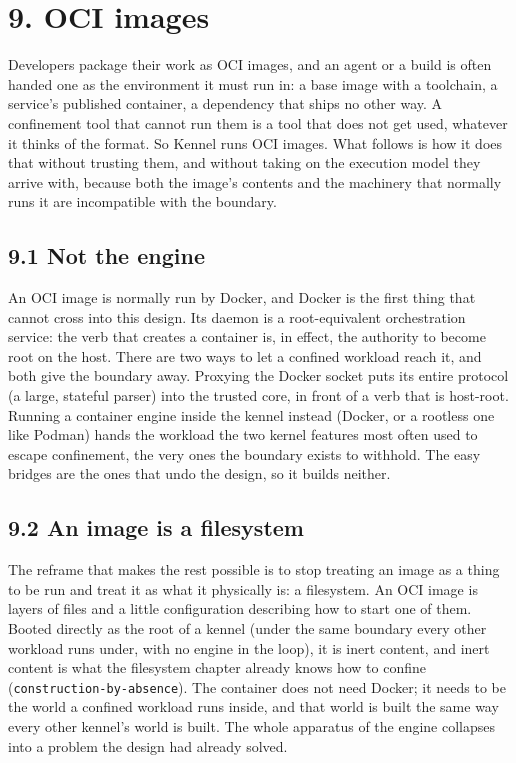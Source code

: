 \hypertarget{oci-images}{%
\chapter{9. OCI images}\label{oci-images}}

Developers package their work as OCI images, and an agent or a build is
often handed one as the environment it must run in: a base image with a
toolchain, a service's published container, a dependency that ships no
other way. A confinement tool that cannot run them is a tool that does
not get used, whatever it thinks of the format. So Kennel runs OCI
images. What follows is how it does that without trusting them, and
without taking on the execution model they arrive with, because both the
image's contents and the machinery that normally runs it are
incompatible with the boundary.

\hypertarget{not-the-engine}{%
\section{9.1 Not the engine}\label{not-the-engine}}

An OCI image is normally run by Docker, and Docker is the first thing
that cannot cross into this design. Its daemon is a root-equivalent
orchestration service: the verb that creates a container is, in effect,
the authority to become root on the host. There are two ways to let a
confined workload reach it, and both give the boundary away. Proxying
the Docker socket puts its entire protocol (a large, stateful parser)
into the trusted core, in front of a verb that is host-root. Running a
container engine inside the kennel instead (Docker, or a rootless one
like Podman) hands the workload the two kernel features most often used
to escape confinement, the very ones the boundary exists to withhold.
The easy bridges are the ones that undo the design, so it builds
neither.

\hypertarget{an-image-is-a-filesystem}{%
\section{9.2 An image is a filesystem}\label{an-image-is-a-filesystem}}

The reframe that makes the rest possible is to stop treating an image as
a thing to be run and treat it as what it physically is: a filesystem.
An OCI image is layers of files and a little configuration describing
how to start one of them. Booted directly as the root of a kennel (under
the same boundary every other workload runs under, with no engine in the
loop), it is inert content, and inert content is what the filesystem
chapter already knows how to confine (\texttt{construction-by-absence}).
The container does not need Docker; it needs to be the world a confined
workload runs inside, and that world is built the same way every other
kennel's world is built. The whole apparatus of the engine collapses
into a problem the design had already solved.

